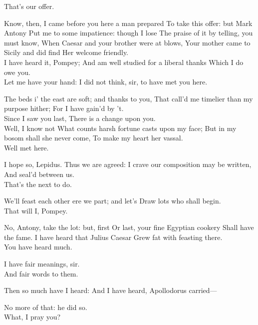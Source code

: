 \documentclass{book}
\begin{document}
\3 \1  That's our offer. 

	Know, then,
	I came before you here a man prepared
	To take this offer: but Mark Antony
	Put me to some impatience: though I lose
	The praise of it by telling, you must know,
	When Caesar and your brother were at blows,
	Your mother came to Sicily and did find
	Her welcome friendly. \\

\1	I have heard it, Pompey;
	And am well studied for a liberal thanks
	Which I do owe you. \\

	Let me have your hand:
	I did not think, sir, to have met you here.

\1	The beds i' the east are soft; and thanks to you,
	That call'd me timelier than my purpose hither;
	For I have gain'd by 't. \\

\3	Since I saw you last,
	There is a change upon you. \\

	Well, I know not
	What counts harsh fortune casts upon my face;
	But in my bosom shall she never come,
	To make my heart her vassal. \\

	Well met here.

	I hope so, Lepidus. Thus we are agreed:
	I crave our composition may be written,
	And seal'd between us. \\

\3	That's the next to do.

	We'll feast each other ere we part; and let's
	Draw lots who shall begin. \\

\1	That will I, Pompey.

	No, Antony, take the lot: but, first
	Or last, your fine Egyptian cookery
	Shall have the fame. I have heard that Julius Caesar
	Grew fat with feasting there. \\

\1	You have heard much.

	I have fair meanings, sir. \\

\1	And fair words to them.

	Then so much have I heard:
	And I have heard, Apollodorus carried---

	No more of that: he did so.  \\

	What, I pray you?
\end{document}
